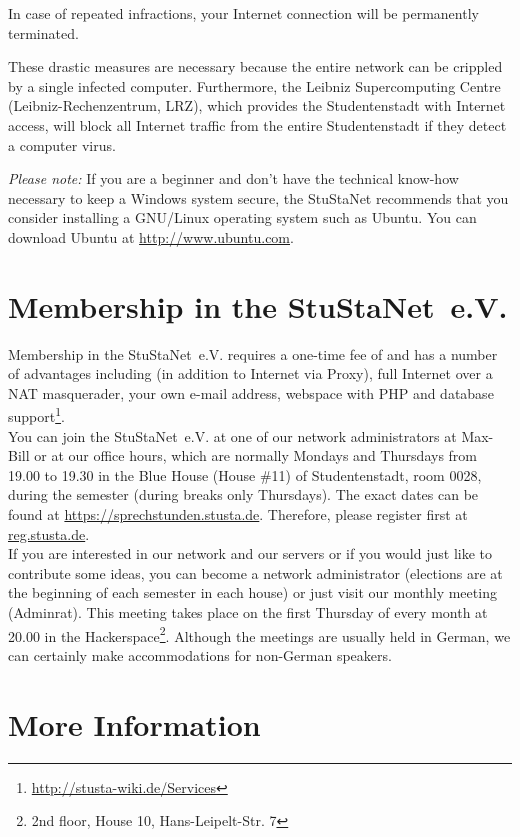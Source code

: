 \documentclass[a4paper,12pt]{scrartcl}
\begin{document}
\begin{em}
In case of repeated infractions, your Internet connection will be permanently terminated.
\end{em}

These drastic measures are necessary because the entire network can be crippled by a single infected computer. Furthermore, the Leibniz Supercomputing Centre (Leibniz-Rechenzentrum, LRZ), which provides the Studentenstadt with Internet access, will block all Internet traffic from the entire Studentenstadt if they detect a computer virus.

\emph{Please note:} If you are a beginner and don't have the technical know-how necessary to keep a Windows system secure, the StuStaNet recommends that you consider installing a GNU/Linux operating system such as Ubuntu. You can download Ubuntu at \url{http://www.ubuntu.com}.


\section*{Membership in the StuStaNet~e.V.}

Membership in the StuStaNet~e.V. requires a one-time fee of  and has a number of advantages including (in addition to Internet via Proxy), full Internet over a NAT masquerader, your own e-mail address, webspace with PHP and database support\footnote{\url{http://stusta-wiki.de/Services}}.
\\
You can join the StuStaNet~e.V. at one of our network administrators at Max-Bill or at our office hours, which are normally Mondays and Thursdays from 19.00 to 19.30 in the Blue House (House \#11) of Studentenstadt, room 0028, during the semester (during breaks only Thursdays). The exact dates can be found at \url{https://sprechstunden.stusta.de}. Therefore, please register first at \url{reg.stusta.de}.
\\
If you are interested in our network and our servers or if you would just like to contribute some ideas, you can become a network administrator (elections are at the beginning of each semester in each house) or just visit our monthly meeting (Adminrat). This meeting takes place on the first Thursday of every month at 20.00 in the Hackerspace\footnote{2nd floor, House 10, Hans-Leipelt-Str. 7}. Although the meetings are usually held in German, we can certainly make accommodations for non-German speakers.

\section*{More Information}
\end{document}
